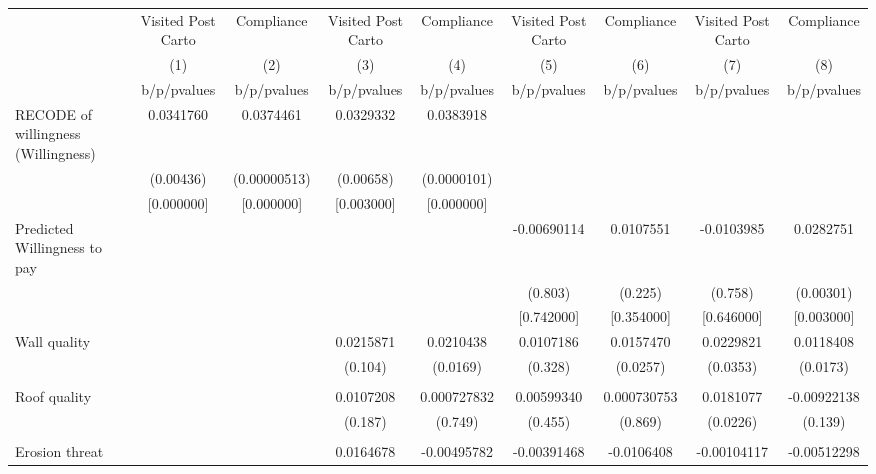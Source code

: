 {
\def\sym#1{\ifmmode^{#1}\else\(^{#1}\)\fi}
\begin{tabular}{l*{8}{c}}
\toprule
                &\multicolumn{1}{c}{Visited Post Carto}&\multicolumn{1}{c}{Compliance}&\multicolumn{1}{c}{Visited Post Carto}&\multicolumn{1}{c}{Compliance}&\multicolumn{1}{c}{Visited Post Carto}&\multicolumn{1}{c}{Compliance}&\multicolumn{1}{c}{Visited Post Carto}&\multicolumn{1}{c}{Compliance}\\
                &\multicolumn{1}{c}{(1)}&\multicolumn{1}{c}{(2)}&\multicolumn{1}{c}{(3)}&\multicolumn{1}{c}{(4)}&\multicolumn{1}{c}{(5)}&\multicolumn{1}{c}{(6)}&\multicolumn{1}{c}{(7)}&\multicolumn{1}{c}{(8)}\\
                &b/p/pvalues&b/p/pvalues&b/p/pvalues&b/p/pvalues&b/p/pvalues&b/p/pvalues&b/p/pvalues&b/p/pvalues\\
\midrule
RECODE of willingness (Willingness)&0.0341760&0.0374461&0.0329332&0.0383918&         &         &         &         \\
                &(0.00436)&(0.00000513)&(0.00658)&(0.0000101)&         &         &         &         \\
                &[0.000000]&[0.000000]&[0.003000]&[0.000000]&         &         &         &         \\
Predicted Willingness to pay&         &         &         &         &-0.00690114&0.0107551&-0.0103985&0.0282751\\
                &         &         &         &         &  (0.803)&  (0.225)&  (0.758)&(0.00301)\\
                &         &         &         &         &[0.742000]&[0.354000]&[0.646000]&[0.003000]\\
Wall quality    &         &         &0.0215871&0.0210438&0.0107186&0.0157470&0.0229821&0.0118408\\
                &         &         &  (0.104)& (0.0169)&  (0.328)& (0.0257)& (0.0353)& (0.0173)\\
                &         &         &         &         &         &         &         &         \\
Roof quality    &         &         &0.0107208&0.000727832&0.00599340&0.000730753&0.0181077&-0.00922138\\
                &         &         &  (0.187)&  (0.749)&  (0.455)&  (0.869)& (0.0226)&  (0.139)\\
                &         &         &         &         &         &         &         &         \\
Erosion threat  &         &         &0.0164678&-0.00495782&-0.00391468&-0.0106408&-0.00104117&-0.00512298\\

\end{tabular}}
